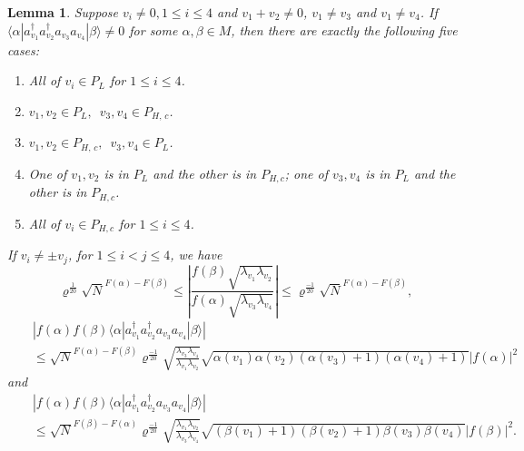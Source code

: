 \documentclass[11pt]{article}
\numberwithin{equation}{section}
\newcommand{\beq}{\begin{equation}}
\newcommand{\eeq}{\end{equation}}
\newcommand{\beqa}{\begin{eqnarray}}
\newcommand{\eeqa}{\end{eqnarray}}
\newcommand\al{{\alpha}}
\newcommand\be{\beta}
\renewcommand\rho\varrho
\newtheorem{lem}{Lemma}[section]
\theoremstyle{definition}
\begin{document}
\begin{lem}\label{fourlegslemma1}
Suppose   $v_i\neq 0, 1\leq i\leq 4$ and  $v_{1} + v_{2} \not = 0$, $v_1\neq v_3$ and $v_1\neq v_4$. If  $\langle \al| a^\dagger_{v_{1}}a^\dagger_{v_2}a_{v_3}a_{v_4}|\be\rangle\neq 0$ for some $\alpha, \beta \in M$, then there are exactly the following five cases:
\begin{enumerate}
	\item All of $v_i\in P_L$ for $1\leq i\leq 4$.
	\item
$	v_{1}, v_{2}\in P_{L}, \,\,\,v_{3}, v_{4}\in P_{H,\,c}$.
	\item[$2'$.]
$	v_{1}, v_{2}\in P_{H,\,c}, \,\,\,v_{3}, v_{4}\in P_{L}$.
	\item One of $v_{1}, v_{2}$ is in $P_L$ and the other is in $P_{H,c}$;  one of $v_{3}, v_{4}$ is in $P_L$ and the other is in $P_{H,c}$.
	\item All of $v_i\in P_{H,c}$ for $1\leq i\leq 4$.
\end{enumerate}
If $v_i\neq \pm v_j$, for $1\leq i<j\leq 4$, we have
\beq 
\rho^{\frac{1}{20}}\sqrt{N}^{F(\al)-F(\be)}\leq \left|\frac{f(\be)\sqrt{\lambda_{v_1}\lambda_{v_2}}}{f(\al)\sqrt{\lambda_{v_3}\lambda_{v_4}}}\right|\leq \rho^{\frac{-1}{20}}\sqrt{N}^{F(\al)-F(\be)},
\eeq
 \beqa\label{no0Fal}
&&\left|f(\al)f(\be)\langle \al| a^\dagger_{v_1}a^\dagger_{v_2}a_{v_3}a_{v_4}|\be\rangle\right|\\\nonumber
 &&\leq \sqrt{N}^{F(\al)-F(\be)}\rho^{\frac{-1}{20}} \sqrt{\frac{\lambda_{v_3}\lambda_{v_4}}{\lambda_{v_1}\lambda_{v_2}}}\sqrt{\al(v_1)\al(v_2)(\al(v_3)+1)(\al(v_4)+1)}|f(\al)|^2
\eeqa
and
\beqa\label{no0Fbe}
&&\left|f(\al)f(\be)\langle \al| a^\dagger_{v_1}a^\dagger_{v_2}a_{v_3}a_{v_4}|\be\rangle\right|\\\nonumber
 &&\leq \sqrt{N}^{F(\be)-F(\al)}\rho^{\frac{-1}{20}} \sqrt{\frac{\lambda_{v_1}\lambda_{v_2}}{\lambda_{v_3}\lambda_{v_4}}}\sqrt{(\be(v_1)+1)(\be(v_2)+1)\be(v_3)\be(v_4)}|f(\be)|^2.
\eeqa
\end{lem}
\end{document}
